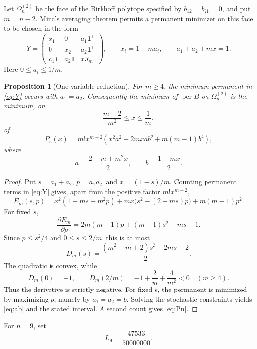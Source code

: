 \documentclass[11pt]{article}
\newtheorem{proposition}[theorem]{Proposition}
\theoremstyle{remark}
\newcommand{\per}{\operatorname{per}}
\newcommand{\one}{\mathbf 1}
\begin{document}
Let $\Omega_n^{(2)}$ be the face of the Birkhoff polytope specified by
$b_{12}=b_{21}=0$, and put $m=n-2$.  Minc's averaging theorem permits a
permanent minimizer on this face to be chosen in the form
\begin{equation}\label{eq:Y}
 Y=
 \begin{pmatrix}
 x_1&0&a_1\one^{\mathsf T}\\
 0&x_2&a_2\one^{\mathsf T}\\
 a_1\one&a_2\one&xJ_m
 \end{pmatrix},
 \qquad x_i=1-ma_i,
 \qquad a_1+a_2+mx=1.
\end{equation}
Here $0\le a_i\le1/m$.

\begin{proposition}[One-variable reduction]\label{prop:face-reduction}
For $m\ge4$, the minimum permanent in \eqref{eq:Y} occurs with $a_1=a_2$.
Consequently the minimum of $\per B$ on $\Omega_n^{(2)}$ is the minimum, on
\[
 \frac{m-2}{m^2}\le x\le\frac1m,
\]
of
\begin{equation}\label{eq:Pn}
 P_n(x)=m!x^{m-2}
 \left(x^2a^2+2mxab^2+m(m-1)b^4\right),
\end{equation}
where
\begin{equation}\label{eq:ab}
 a=\frac{2-m+m^2x}{2},\qquad b=\frac{1-mx}{2}.
\end{equation}
\end{proposition}
\begin{proof}
Put $s=a_1+a_2$, $p=a_1a_2$, and $x=(1-s)/m$.  Counting permanent terms in
\eqref{eq:Y} gives, apart from the positive factor $m!x^{m-2}$,
\[
 E_m(s,p)=x^2(1-ms+m^2p)
 +mx\bigl(s^2-(2+ms)p\bigr)+m(m-1)p^2.
\]
For fixed $s$,
\[
 \frac{\partial E_m}{\partial p}
 =2m(m-1)p+(m+1)s^2-ms-1.
\]
Since $p\le s^2/4$ and $0\le s\le2/m$, this is at most
\[
 D_m(s)=\frac{(m^2+m+2)s^2-2ms-2}{2}.
\]
The quadratic is convex, while
\[
 D_m(0)=-1,
 \qquad D_m(2/m)=-1+\frac2m+\frac4{m^2}<0
 \quad(m\ge4).
\]
Thus the derivative is strictly negative.  For fixed $s$, the permanent is
minimized by maximizing $p$, namely by $a_1=a_2=b$.  Solving the stochastic
constraints yields \eqref{eq:ab} and the stated interval.  A second count
gives \eqref{eq:Pn}.
\end{proof}

For $n=9$, set
\begin{equation}\label{eq:L}
 L_9=\frac{47533}{50000000}.
\end{equation}
\end{document}
